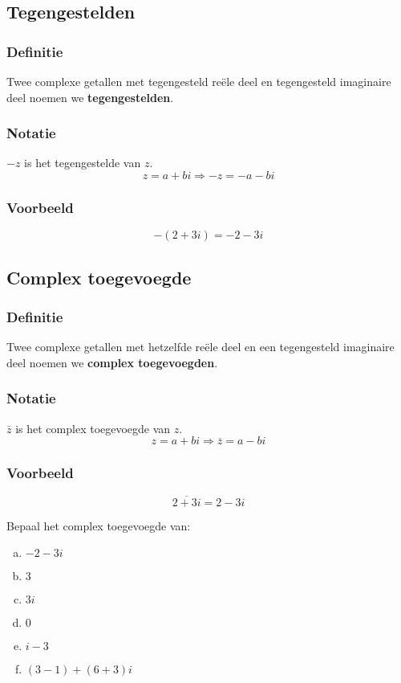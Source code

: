 \documentclass[12pt,twoside,a4paper]{article}
\begin{document}
\needspace{6cm}
\subsection{Tegengestelden}

\subsubsection*{Definitie}
\begin{mdframed}
Twee complexe getallen met tegengesteld reële deel en tegengesteld imaginaire deel noemen we {\bf tegengestelden}.
\end{mdframed}

\subsubsection*{Notatie}
$-z$ is het tegengestelde van $z$.
\[z=a+bi \Rightarrow -z=-a-bi\]

\subsubsection*{Voorbeeld}
$$-(2+3i)=-2-3i$$

\subsection{Complex toegevoegde}

\subsubsection*{Definitie}
\begin{mdframed}
Twee complexe getallen met hetzelfde reële deel en een tegengesteld imaginaire deel noemen we {\bf complex toegevoegden}.
\end{mdframed}

\subsubsection*{Notatie}
$\bar{z}$ is het complex toegevoegde van $z$.
\[z=a+bi \Rightarrow \overline{z}=a-bi\]

\subsubsection*{Voorbeeld}
$$\overline{2+3i}=2-3i$$

\begin{oefening}
Bepaal het complex toegevoegde van:
\begin{multicols}{2}
  \begin{enumerate}[(a)]
    \itemsep.5em
  \item $-2-3i$
  \item $3$
  \item $3i$
  \item $0$
  \item $i-3$
  \item $(3-1)+(6+3)i$
\end{enumerate}
\end{multicols}
\end{oefening}
\end{document}
